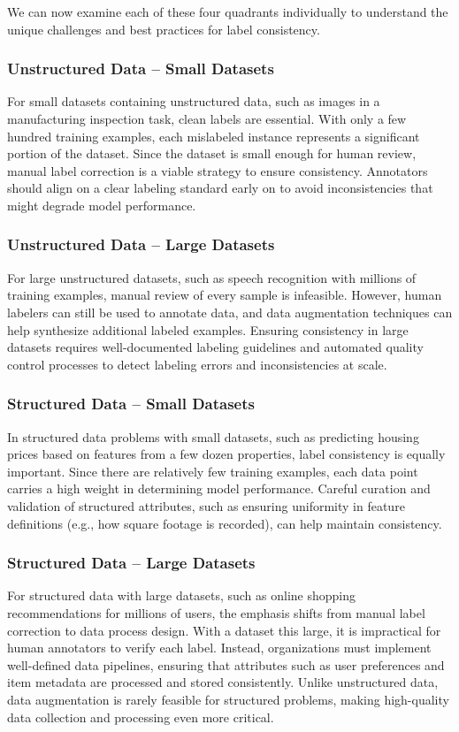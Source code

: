 \documentclass[12pt,openany]{book}
\begin{document}
We can now examine each of these four quadrants individually to understand the unique challenges and best practices for label consistency.

\subsubsection{Unstructured Data – Small Datasets}
For small datasets containing unstructured data, such as images in a manufacturing inspection task, clean labels are essential. With only a few hundred training examples, each mislabeled instance represents a significant portion of the dataset. Since the dataset is small enough for human review, manual label correction is a viable strategy to ensure consistency. Annotators should align on a clear labeling standard early on to avoid inconsistencies that might degrade model performance.

\subsubsection{Unstructured Data – Large Datasets}
For large unstructured datasets, such as speech recognition with millions of training examples, manual review of every sample is infeasible. However, human labelers can still be used to annotate data, and data augmentation techniques can help synthesize additional labeled examples. Ensuring consistency in large datasets requires well-documented labeling guidelines and automated quality control processes to detect labeling errors and inconsistencies at scale.

\subsubsection{Structured Data – Small Datasets}
In structured data problems with small datasets, such as predicting housing prices based on features from a few dozen properties, label consistency is equally important. Since there are relatively few training examples, each data point carries a high weight in determining model performance. Careful curation and validation of structured attributes, such as ensuring uniformity in feature definitions (e.g., how square footage is recorded), can help maintain consistency.

\subsubsection{Structured Data – Large Datasets}
For structured data with large datasets, such as online shopping recommendations for millions of users, the emphasis shifts from manual label correction to data process design. With a dataset this large, it is impractical for human annotators to verify each label. Instead, organizations must implement well-defined data pipelines, ensuring that attributes such as user preferences and item metadata are processed and stored consistently. Unlike unstructured data, data augmentation is rarely feasible for structured problems, making high-quality data collection and processing even more critical.
\end{document}
